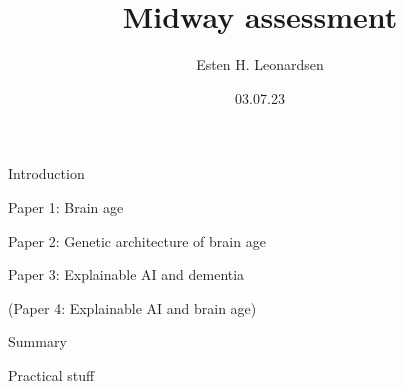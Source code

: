 \documentclass[9pt]{beamer}
\date{03.07.23}
\title{Midway assessment}
\subtitle{}
\author{Esten H. Leonardsen}
\begin{document}
	\begin{frame}
	 	\maketitle
	\end{frame}

	\begin{frame}{Introduction}
	\end{frame}

	\begin{frame}{Paper 1: Brain age}
	\end{frame}

	\begin{frame}{Paper 2: Genetic architecture of brain age}
	\end{frame}

	\begin{frame}{Paper 3: Explainable AI and dementia}
	\end{frame}

	\begin{frame}(Paper 4: Explainable AI and brain age)
	\end{frame}

	\begin{frame}{Summary}
	\end{frame}

	\begin{frame}{Practical stuff}
	\end{frame}
\end{document}
